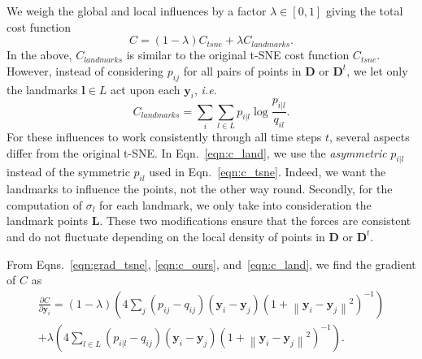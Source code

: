 We weigh the global and local influences by a factor $\lambda  \in [0, 1]$ giving the total cost function
%
\begin{equation}
C = (1-\lambda)C_{tsne} + \lambda C_{landmarks}. 
\label{eqn:c_ours}
\end{equation}
%
In the above, $C_{landmarks}$ is similar to the original t-SNE cost function $C_{tsne}$. However, instead of considering $p_{ij}$ for all pairs of points in $\mathbf{D}$ or $\mathbf{D}^t$, we let only the landmarks $ \mathbf{l} \in L$ act upon each $\mathbf{y}_i$, \emph{i.e.} 
%
\begin{equation}
C_{landmarks}=\sum_{i} \sum_{l \in L} p_{i|l} \log \frac{p_{i|l}}{q_{il}}.
\label{eqn:c_land}
\end{equation}
%
For these influences to work consistently through all time steps $t$, several aspects differ from the original t-SNE. In Eqn.~\ref{eqn:c_land}, we use the \emph{asymmetric} $p_{i|l}$ instead of the symmetric $p_{il}$ used in Eqn.~\ref{eqn:c_tsne}. Indeed, we want the landmarks to influence the points, not the other way round. Secondly, for the computation of $\sigma_l$ for each landmark, we only take into consideration the landmark points $\mathbf{L}$. These two modifications ensure that the forces are consistent and do not fluctuate depending on the local density of points in $\mathbf{D}$ or $\mathbf{D}^t$.

From Eqns.~\ref{eqn:grad_tsne}, \ref{eqn:c_ours}, and~\ref{eqn:c_land}, we find the gradient of $C$ as
%
\begin{equation*}
  \begin{aligned}
    \frac{\partial C}{\partial \mathbf{y}_{i}} =(1-\lambda)\left(4 \sum_{j}\left(p_{i j}-q_{i j}\right)\left(\mathbf{y}_{i}-\mathbf{y}_{j}\right)\left(1+\left\|\mathbf{y}_{i}-\mathbf{y}_{j}\right\|^{2}\right)^{-1}\right) \\
    +\lambda\left(4 \sum_{l \in L}\left(p_{i | l}-q_{i j}\right)\left(\mathbf{y}_{i}-\mathbf{y}_{j}\right)\left(1+\left\|\mathbf{y}_{i}-\mathbf{y}_{j}\right\|^{2}\right)^{-1}\right).
  \end{aligned}
\end{equation*}


